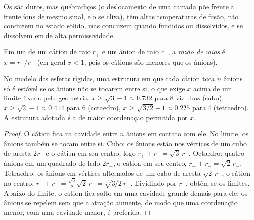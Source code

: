 \begin{proposition}\label{prop:b1:crystals-ionic-covalent:ionic-properties}
Os  são duros, mas quebradiços (o deslocamento de uma
camada põe frente a frente íons de mesmo sinal, e o  se cliva),
têm altas temperaturas de fusão, não conduzem no estado sólido, mas
conduzem quando fundidos ou dissolvidos, e se dissolvem em  de alta permissividade.
\end{proposition}
\admitted

\begin{definition}\label{def:b1:crystals-ionic-covalent:radius-ratio}
Em um  de um cátion de raio $r_+$ e um ânion de raio
$r_-$, a \emph{razão de raios} é $x = r_+/r_-$
(em geral $x < 1$, pois os cátions são menores que os ânions).
\end{definition}

\begin{proposition}\label{prop:b1:crystals-ionic-covalent:rule}
No modelo das esferas rígidas, uma estrutura em que cada cátion toca $n$
ânions só é estável se os ânions não se tocarem entre si, o que exige
$x$ acima de um limite fixado pela geometria: $x \ge \sqrt3 - 1
\approx 0.732$ para 8 vizinhos (cubo), $x \ge \sqrt2 - 1 \approx 0.414$
para 6 (octaedro), $x \ge \sqrt{3/2} - 1 \approx 0.225$ para 4
(tetraedro). A estrutura adotada é a de maior coordenação permitida
por $x$.
\end{proposition}

\begin{proof}
O cátion fica na cavidade entre $n$ ânions em contato com ele. No
limite, os ânions também se tocam entre si. Cubo: os ânions estão nos
vértices de um cubo de aresta $2r_-$ e o cátion em seu centro, logo $r_+ +
r_- = \sqrt3\,r_-$. Octaedro: quatro ânions em um quadrado de
lado $2r_-$, o cátion em seu centro, $r_+ + r_- = \sqrt2\,r_-$.
Tetraedro: os ânions em vértices alternados de um cubo de aresta
$\sqrt2\,r_-$, o cátion no centro,
$r_+ + r_- = \frac{\sqrt3}{2}\sqrt2\,r_- = \sqrt{3/2}\,r_-$.
Dividindo por $r_-$, obtêm-se os limites. Abaixo do limite, o cátion
fica solto em uma cavidade grande demais para ele: os ânions se repelem
sem que a atração aumente, de modo que uma coordenação menor, com uma
cavidade menor, é preferida.
\end{proof}

